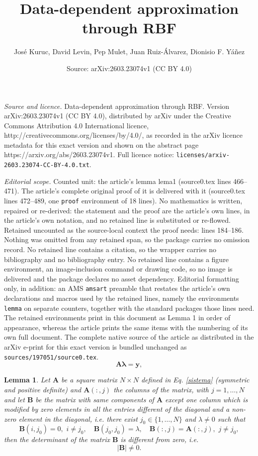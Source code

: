 \documentclass[10pt,a4paper]{amsart}
\title{Data-dependent approximation through RBF}
\author{Jos\'e Kuruc, David Levin, Pep Mulet, Juan Ruiz-\'Alvarez, Dionisio F. Y\'a\~nez}
\date{Source: arXiv:2603.23074v1 (CC BY 4.0)}
\newtheorem{lemma}{Lemma}
\begin{document}
\maketitle

\noindent\emph{Source and licence.} Data-dependent approximation through RBF. Version arXiv:2603.23074v1 (CC BY 4.0), distributed by arXiv under the Creative Commons Attribution 4.0 International licence, http://creativecommons.org/licenses/by/4.0/, as recorded in the arXiv licence metadata for this exact version and shown on the abstract page https://arxiv.org/abs/2603.23074v1. Full licence notice: \texttt{licenses/arxiv-2603.23074-CC-BY-4.0.txt}.\par\smallskip

\noindent\textit{Editorial scope.} Counted unit: the article's lemma lema1 (source0.tex lines 466--471). The article's complete original proof of it is delivered with it (source0.tex lines 472--489, one \texttt{proof} environment of 18 lines). No mathematics is written, repaired or re-derived: the statement and the proof are the article's own lines, in the article's own notation, and no retained line is substituted or re-flowed.  Retained uncounted as the source-local context the proof needs: lines 184--186.  Nothing was omitted from any retained span, so the package carries no omission record.  No retained line contains a citation, so the wrapper carries no bibliography and no bibliography entry.  No retained line contains a figure environment, an image-inclusion command or drawing code, so no image is delivered and the package declares no asset dependency.  Editorial formatting only, in addition: an AMS \texttt{amsart} preamble that restates the article's own declarations and macros used by the retained lines, namely the environments \texttt{lemma} on separate counters, together with the standard packages those lines need.  The retained environments print in this document as Lemma 1 in order of appearance, whereas the article prints the same items with the numbering of its own full document.  The complete native source of the article as distributed in the arXiv e-print for this exact version is bundled unchanged as \texttt{sources/197051/source0.tex}.
\begin{equation}\label{sistema}
\mathbf{A} \boldsymbol{\lambda} = \mathbf{y},
\end{equation}

\begin{lemma}\label{lema1}
Let $\mathbf{A}$ be a square matrix $N\times N$ defined in Eq. \eqref{sistema} (symmetric and positive definite) and $\mathbf{A}(:,j)$ the columns of the matrix, with $j=1,\hdots,N$ and let $\mathbf{B}$ be the matrix with same components of $\mathbf{A}$ except one column which is modified by zero elements in all the entries different of the diagonal and a non-zero element in the diagonal, i.e. there exist $j_0\in\{1,\dots,N\}$ and $\lambda\neq 0$ such that
$$\mathbf{B}(i,j_0)=0,\,\, i\neq j_0, \quad \mathbf{B}(j_0,j_0)=\lambda,\quad \mathbf{B}(:,j)=\mathbf{A}(:,j),\,\, j\neq j_0,$$
then the determinant of the matrix $\mathbf{B}$ is different from zero, i.e.
$$|\mathbf{B}|\neq 0.$$
\end{lemma}
\end{document}
